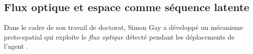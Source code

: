 









\subsection{Flux optique et espace comme séquence latente}
\label{sec:simon}

\noindent
Dans le cadre de son travail de doctorat, Simon Gay a développé un mécanisme proto-spatial qui exploite le \emph{flux optique} détecté pendant les déplacements de l'agent \cite[]{gay_autonomous_2014}.



